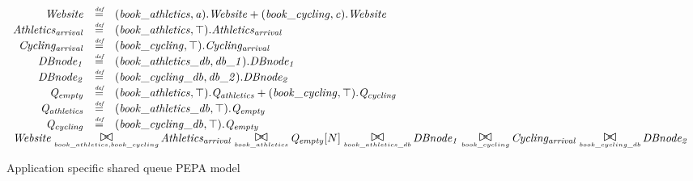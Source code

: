 \begin{figure}
	\caption{Application specific shared queue PEPA model}
	\centering
	\begin{displaymath}
	\begin{array}{rcl}
	\mathit{Website} & \rmdef & (\mathit{book\_athletics},\mathit{a}).\mathit{Website}+(\mathit{book\_cycling},\mathit{c}).\mathit{Website}\\
	\mathit{Athletics_{arrival}} & \rmdef & (\mathit{book\_athletics},\top).\mathit{Athletics_{arrival}}\\
	\mathit{Cycling_{arrival}} & \rmdef & (\mathit{book\_cycling},\top).\mathit{Cycling_{arrival}}\\
	\mathit{DBnode_1} & \rmdef & (\mathit{book\_athletics\_db},\mathit{db\_1}).\mathit{DBnode_1}\\
	\mathit{DBnode_2} & \rmdef & (\mathit{book\_cycling\_db},\mathit{db\_2}).\mathit{DBnode_2}\\
	\mathit{Q_{empty}} & \rmdef & (\mathit{book\_athletics},\top).\mathit{Q_{athletics}}+(\mathit{book\_cycling},\top).\mathit{Q_{cycling}}\\
	\mathit{Q_{athletics}} & \rmdef & (\mathit{book\_athletics\_db},\top).\mathit{Q_{empty}}\\
	\mathit{Q_{cycling}} & \rmdef & (\mathit{book\_cycling\_db},\top).\mathit{Q_{empty}}\\
	[0.0ex]		\multicolumn{3}{l}{\mathit{Website}\sync{book\_athletics,book\_cycling}\mathit{Athletics_{arrival}}\sync{book\_athletics}\mathit{Q_{empty}}[N]\sync{book\_athletics\_db}\mathit{DBnode_1}\sync{book\_cycling}\mathit{Cycling_{arrival}}\sync{book\_cycling\_db}\mathit{DBnode_2}}\\
	[0.0ex]	\end{array}
	\end{displaymath}
\end{figure}

